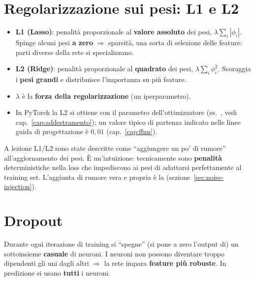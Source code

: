 \section{Regolarizzazione sui pesi: L1 e L2}
\begin{itemize}
  \item \textbf{L1 (Lasso)}: penalità proporzionale al \textbf{valore assoluto} dei pesi, $\lambda\sum_i|\phi_i|$. Spinge alcuni pesi
        \textbf{a zero} $\Rightarrow$ sparsità, una sorta di selezione delle feature: parti diverse della rete si specializzano.
  \item \textbf{L2 (Ridge)}: penalità proporzionale al \textbf{quadrato} dei pesi, $\lambda\sum_i\phi_i^2$. Scoraggia i
        \textbf{pesi grandi} e distribuisce l'importanza su più feature.
  \item $\lambda$ è la \textbf{forza della regolarizzazione} (un iperparametro).
  \item In PyTorch la L2 si ottiene con il parametro  dell'ottimizzatore (es.\ , vedi
        cap.~\ref{cap:addestramento}); un valore tipico di partenza indicato nelle linee guida di progettazione è $0{,}01$
        (cap.~\ref{cap:ffnn}).
\end{itemize}
\begin{integrazione}
A lezione L1/L2 sono state descritte come ``aggiungere un po' di rumore'' all'aggiornamento dei pesi. È un'intuizione:
tecnicamente sono \textbf{penalità} deterministiche nella loss che impediscono ai pesi di adattarsi perfettamente al training
set. L'aggiunta di rumore vera e propria è la  (sezione~\ref{sec:noise-injection}).
\end{integrazione}

\section{Dropout}
\begin{definizione}[dropout]
Durante ogni iterazione di training si ``spegne'' (si pone a zero l'output di) un sottoinsieme \textbf{casuale} di neuroni.
I neuroni non possono diventare troppo dipendenti gli uni dagli altri $\Rightarrow$ la rete impara \textbf{feature più robuste}.
In predizione si usano \textbf{tutti} i neuroni.
\end{definizione}

